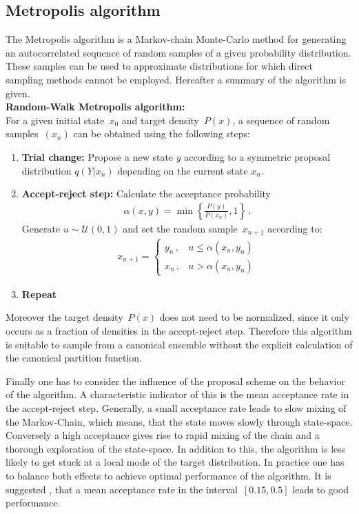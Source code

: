 \documentclass[11pt, a4paper]{article}
\numberwithin{equation}{section}
\begin{document}
\subsection{Metropolis algorithm} \label{sec:Metropolis}
The Metropolis algorithm is a Markov-chain Monte-Carlo method for generating an autocorrelated sequence of random samples of a given probability distribution.
These samples can be used to approximate distributions for which direct sampling methods cannot be employed.
Hereafter a summary of the algorithm is given.\\

\noindent\textbf{Random-Walk Metropolis algorithm:}\\
For a given initial state~$x_0$ and target density~$P(x)$, a sequence of random samples~$\left( x_n \right)$ can be obtained using the following steps:
\begin{enumerate}
	\item \textbf{Trial change:}
		Propose a new state $y$ according to a symmetric proposal distribution $q(Y|x_n)$ depending on the current state $x_n$.
		
	\item \textbf{Accept-reject step:}
		Calculate the acceptance probability
		\begin{align*}
			\alpha(x, y) = \min\left\{ \frac{P(y)}{P(x_n)}, 1\right\} \,\text{.}
		\end{align*}
		Generate $u \sim \mathcal{U}(0, 1)$ and set the random sample~$x_{n+1}$ according to:
		\begin{align*}
			x_{n+1} = \begin{cases}
					y_n \,, & u \leq \alpha(x_n, y_n) \\
					x_n \,, & u > \alpha(x_n, y_n)
				\end{cases}
		\end{align*}
		
	\item \textbf{Repeat}
\end{enumerate}
Moreover the target density~$P(x)$ does not need to be normalized, since it only occurs as a fraction of densities in the accept-reject step.
Therefore this algorithm is suitable to sample from a canonical ensemble without the explicit calculation of the canonical partition function.

Finally one has to consider the influence of the proposal scheme on the behavior of the algorithm.
A characteristic indicator of this is the mean acceptance rate in the accept-reject step.
Generally, a small acceptance rate leads to slow mixing of the Markov-Chain, which means, that the state moves slowly through state-space.
Conversely a high acceptance gives rise to rapid mixing of the chain and a thorough exploration of the state-space.
In addition to this, the algorithm is less likely to get stuck at a local mode of the target distribution.
In practice one has to balance both effects to achieve optimal performance of the algorithm.
It is suggested \cite{gilks_richardson}, that a mean acceptance rate in the interval~$[0.15, 0.5]$ leads to good performance.
\end{document}
